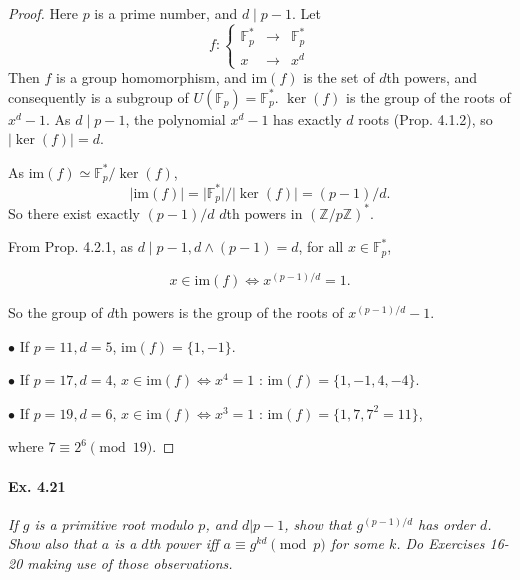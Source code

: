 \documentclass[11pt,a4paper]{article}
\newcommand{\Z}{\mathbb{Z}}
\newcommand{\F}{\mathbb{F}}
\begin{document}
\begin{proof}
Here $p$ is a prime number, and $d \mid p-1$. Let
$$f : 
\left\{
\begin{array}{ccc}
  \F_p^*&  \to  &\F_p^*   \\
  x&  \to  &   x^d
\end{array}
\right.
$$
Then $f$ is a group homomorphism, and $\mathrm{im}(f)$ is the set of $d$th powers, and consequently is a subgroup of $U(\F_p) = \F_p^*$.
$\ker(f)$ is the group of the roots of $x^d-1$. As $d \mid p-1$, the polynomial $x^d-1$ has exactly $d$ roots (Prop. 4.1.2), so $\vert \ker(f) \vert = d$. 

As $\mathrm{im}(f) \simeq \F_p^* /\ker(f)$,
$$\vert \mathrm{im}(f) \vert = \vert \F_p^*  \vert / \vert \ker(f) \vert = (p-1)/d.$$
So there exist exactly $(p-1)/d$ $d$th powers in $(\Z/p\Z)^*$.

\bigskip

From Prop. 4.2.1, as $d \mid p-1, d \wedge (p-1)=d$, for all $x \in \F_p^*$, 

$$x \in \mathrm{im}(f) \iff x^{(p-1)/d} = 1.$$

So the group of $d$th powers is the group of the roots of $x^{(p-1)/d} - 1$.

$\bullet$ If $p=11,d=5$, $\mathrm{im}(f) = \{1,-1\}$.

$\bullet$ If $p = 17, d= 4$, $x \in \mathrm{im}(f) \iff x^4 = 1$ : $\mathrm{im}(f) = \{1,-1,4,-4\}$.

$\bullet$ If $p=19,d=6$, $x \in \mathrm{im}(f) \iff x^3 = 1$ : $\mathrm{im}(f) = \{1,7,7^2 = 11\}$, 

where $7 \equiv 2^6 \pmod {19}$.
\end{proof}

\paragraph{Ex. 4.21}

{\it If $g$ is a primitive root modulo $p$, and $d|p-1$, show that $g^{(p-1)/d}$ has order $d$. Show also that $a$ is a $d$th power iff $a \equiv g^{kd} \pmod p$ for some $k$. Do Exercises 16-20 making use of those observations.
}
\end{document}
